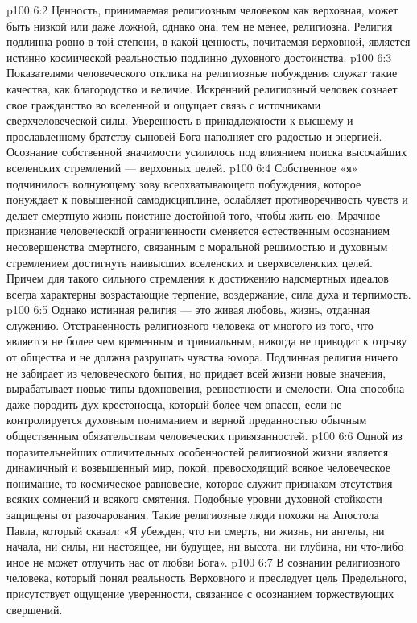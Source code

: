 \vs p100 6:2 Ценность, принимаемая религиозным человеком как верховная, может быть низкой или даже ложной, однако она, тем не менее, религиозна. Религия подлинна ровно в той степени, в какой ценность, почитаемая верховной, является истинно космической реальностью подлинно духовного достоинства.
\vs p100 6:3 Показателями человеческого отклика на религиозные побуждения служат такие качества, как благородство и величие. Искренний религиозный человек сознает свое гражданство во вселенной и ощущает связь с источниками сверхчеловеческой силы. Уверенность в принадлежности к высшему и прославленному братству сыновей Бога наполняет его радостью и энергией. Осознание собственной значимости усилилось под влиянием поиска высочайших вселенских стремлений --- верховных целей.
\vs p100 6:4 Собственное «я» подчинилось волнующему зову всеохватывающего побуждения, которое понуждает к повышенной самодисциплине, ослабляет противоречивость чувств и делает смертную жизнь поистине достойной того, чтобы жить ею. Мрачное признание человеческой ограниченности сменяется естественным осознанием несовершенства смертного, связанным с моральной решимостью и духовным стремлением достигнуть наивысших вселенских и сверхвселенских целей. Причем для такого сильного стремления к достижению надсмертных идеалов всегда характерны возрастающие терпение, воздержание, сила духа и терпимость.
\vs p100 6:5 Однако истинная религия --- это живая любовь, жизнь, отданная служению. Отстраненность религиозного человека от многого из того, что является не более чем временным и тривиальным, никогда не приводит к отрыву от общества и не должна разрушать чувства юмора. Подлинная религия ничего не забирает из человеческого бытия, но придает всей жизни новые значения, вырабатывает новые типы вдохновения, ревностности и смелости. Она способна даже породить дух крестоносца, который более чем опасен, если не контролируется духовным пониманием и верной преданностью обычным общественным обязательствам человеческих привязанностей.
\vs p100 6:6 \pc Одной из поразительнейших отличительных особенностей религиозной жизни является динамичный и возвышенный мир, покой, превосходящий всякое человеческое понимание, то космическое равновесие, которое служит признаком отсутствия всяких сомнений и всякого смятения. Подобные уровни духовной стойкости защищены от разочарования. Такие религиозные люди похожи на Апостола Павла, который сказал: «Я убежден, что ни смерть, ни жизнь, ни ангелы, ни начала, ни силы, ни настоящее, ни будущее, ни высота, ни глубина, ни что\hyp{}либо иное не может отлучить нас от любви Бога».
\vs p100 6:7 В сознании религиозного человека, который понял реальность Верховного и преследует цель Предельного, присутствует ощущение уверенности, связанное с осознанием торжествующих свершений.
